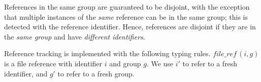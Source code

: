 References in the same group are guaranteed to be disjoint, with the exception that multiple instances of the \textit{same} reference can be in the same group; this is detected with the reference identifier. Hence, references are disjoint if they are in the \textit{same group} and have \textit{different identifiers}.

Reference tracking is implemented with the following typing rules. \( \textit{file\_ref}\,(i, g) \) is a file reference with identifier \( i \) and group \( g \). We use \( i' \) to refer to a fresh identifier, and \( g' \) to refer to a fresh group.

\vspace{4mm}

\hspace*{-1.5cm}\begin{minipage}{.5\paperwidth}
  \begin{prooftree}
  \end{prooftree}
\end{minipage}%
\hspace*{-1.3cm}\begin{minipage}{.5\paperwidth}
  \begin{prooftree}
  \end{prooftree}
\end{minipage}

\begin{prooftree}
\end{prooftree}

\begin{prooftree}
\end{prooftree}


